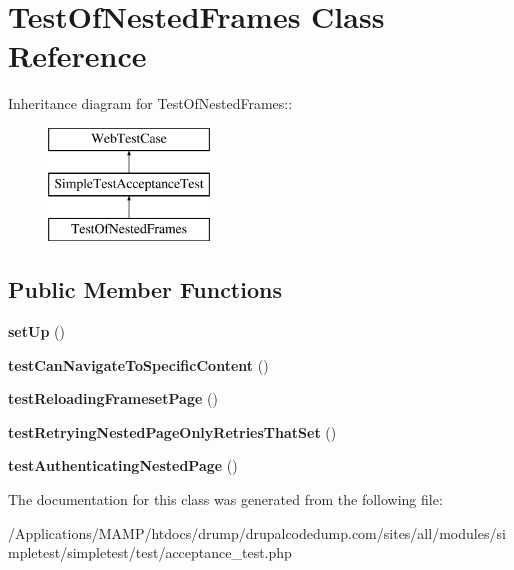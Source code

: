 \hypertarget{class_test_of_nested_frames}{
\section{TestOfNestedFrames Class Reference}
\label{class_test_of_nested_frames}
}
Inheritance diagram for TestOfNestedFrames::\begin{figure}[H]
\begin{center}
\leavevmode
\includegraphics[height=3cm]{class_test_of_nested_frames}
\end{center}
\end{figure}
\subsection*{Public Member Functions}
\begin{DoxyCompactItemize}
\item 
\hypertarget{class_test_of_nested_frames_a284951b6e6cc7e7995b83c1170125f09}{
{\bfseries setUp} ()}
\label{class_test_of_nested_frames_a284951b6e6cc7e7995b83c1170125f09}

\item 
\hypertarget{class_test_of_nested_frames_aeba8ba74fa9aa4df06bccbb88fb7f813}{
{\bfseries testCanNavigateToSpecificContent} ()}
\label{class_test_of_nested_frames_aeba8ba74fa9aa4df06bccbb88fb7f813}

\item 
\hypertarget{class_test_of_nested_frames_a3ee4b817c1dbeeb3e84b343f8e5b74d0}{
{\bfseries testReloadingFramesetPage} ()}
\label{class_test_of_nested_frames_a3ee4b817c1dbeeb3e84b343f8e5b74d0}

\item 
\hypertarget{class_test_of_nested_frames_af93cdb88388ed0d5352dbb722b501e5d}{
{\bfseries testRetryingNestedPageOnlyRetriesThatSet} ()}
\label{class_test_of_nested_frames_af93cdb88388ed0d5352dbb722b501e5d}

\item 
\hypertarget{class_test_of_nested_frames_a9849e29a3931e2e55d7ac9095c92e102}{
{\bfseries testAuthenticatingNestedPage} ()}
\label{class_test_of_nested_frames_a9849e29a3931e2e55d7ac9095c92e102}

\end{DoxyCompactItemize}


The documentation for this class was generated from the following file:\begin{DoxyCompactItemize}
\item 
/Applications/MAMP/htdocs/drump/drupalcodedump.com/sites/all/modules/simpletest/simpletest/test/acceptance\_\-test.php\end{DoxyCompactItemize}
